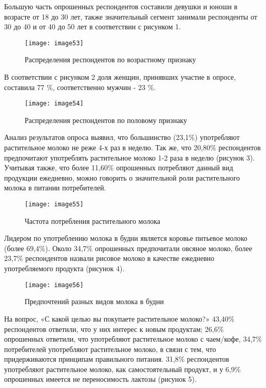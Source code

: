 \begin{multicols}{2}
Большую часть опрошенных респондентов составили девушки и юноши в
возрасте от 18 до 30 лет, также значительный сегмент занимали
респонденты от 30 до 40 и от 40 до 50 лет в соответствии с рисунком 1.
\end{multicols}

\begin{figure}[H]
\centering
\texttt{[image: image53]}
\caption{Распределения респондентов по возрастному признаку}
\end{figure}

В соответствии с рисунком 2 доля женщин, принявших участие в опросе,
составила 77 \%, соответственно мужчин - 23 \%.

\begin{figure}[H]
\centering
\texttt{[image: image54]}
\caption{Распределения респондентов по половому признаку}
\end{figure}

Анализ результатов опроса выявил, что большинство (23,1\%) употребляют
растительное молоко не реже 4-х раз в неделю. Так же, что 20,80\%
респондентов предпочитают употреблять растительное молоко 1-2 раза в
неделю (рисунок 3). Учитывая также, что более 11,60\% опрошенных
потребляют данный вид продукции ежедневно, можно говорить о значительной
роли растительного молока в питании потребителей.

\begin{figure}[H]
\centering
\texttt{[image: image55]}
\caption{Частота потребления растительного молока}
\end{figure}

Лидером по употреблению молока в будни является коровье питьевое молоко
(более 69,4\%). Около 34,7\% опрошенных предпочитали овсяное молоко,
более 23,7\% респондентов назвали рисовое молоко в качестве ежедневно
употребляемого продукта (рисунок 4).

\begin{figure}[H]
\centering
\texttt{[image: image56]}
\caption{Предпочтений разных видов молока в будни}
\end{figure}

На вопрос, «С какой целью вы покупаете растительное молоко?» 43,40\%
респондентов ответили, что у них интерес к новым продуктам; 26,6\%
опрошенных ответили, что употребляют растительное молоко с чаем/кофе,
34,7\% потребителей употребляют растительное молоко, в связи с тем, что
придерживаются принципам правильного питания. 31,8\% респондентов
употребляют растительное молоко, как самостоятельный продукт, и у 6,9\%
опрошенных имеется не переносимость лактозы (рисунок 5).

